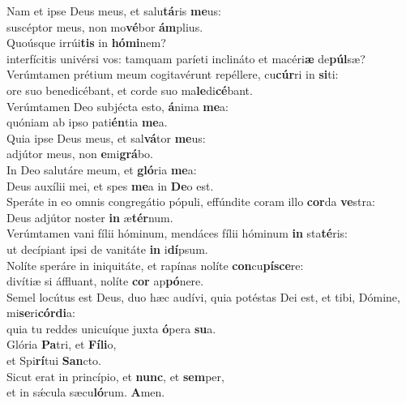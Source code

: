 \evenverse Nam et ipse Deus meus, et salu\textbf{tá}ris \textbf{me}us:~\*\\
\evenverse suscéptor meus, non mo\textbf{vé}bor \textbf{ám}plius.\\
\oddverse Quoúsque irrúi\textbf{tis} in \textbf{hó}\textbf{mi}nem?~\*\\
\oddverse interfícitis univérsi vos: tamquam paríeti inclináto et macéri\textbf{æ} de\textbf{púl}sæ?\\
\evenverse Verúmtamen prétium meum cogitavérunt repéllere, cu\textbf{cúr}ri in \textbf{si}ti:~\*\\
\evenverse ore suo benedicébant, et corde suo ma\textbf{le}di\textbf{cé}bant.\\
\oddverse Verúmtamen Deo subjécta esto, \textbf{á}nima \textbf{me}a:~\*\\
\oddverse quóniam ab ipso pati\textbf{én}tia \textbf{me}a.\\
\evenverse Quia ipse Deus meus, et sal\textbf{vá}tor \textbf{me}us:~\*\\
\evenverse adjútor meus, non \textbf{e}mi\textbf{grá}bo.\\
\oddverse In Deo salutáre meum, et \textbf{gló}ria \textbf{me}a:~\*\\
\oddverse Deus auxílii mei, et spes \textbf{me}a in \textbf{De}o est.\\
\evenverse Speráte in eo omnis congregátio pópuli, effúndite coram illo \textbf{cor}da \textbf{ve}stra:~\*\\
\evenverse Deus adjútor noster \textbf{in} æ\textbf{tér}num.\\
\oddverse Verúmtamen vani fílii hóminum, mendáces fílii hóminum \textbf{in} sta\textbf{té}ris:~\*\\
\oddverse ut decípiant ipsi de vanitáte \textbf{in} i\textbf{dí}psum.\\
\evenverse Nolíte speráre in iniquitáte, et rapínas nolíte \textbf{con}cu\textbf{pí}\textbf{sce}re:~\*\\
\evenverse divítiæ si áffluant, nolíte \textbf{cor} ap\textbf{pó}nere.\\
\oddverse Semel locútus est Deus, duo hæc audívi, quia potéstas Dei est, et tibi, Dómine, mi\textbf{se}ri\textbf{cór}\textbf{di}a:~\*\\
\oddverse quia tu reddes unicuíque juxta \textbf{ó}pera \textbf{su}a.\\
\evenverse Glória \textbf{Pa}tri, et \textbf{Fí}\textbf{li}o,~\*\\
\evenverse et Spi\textbf{rí}tui \textbf{San}cto.\\
\oddverse Sicut erat in princípio, et \textbf{nunc}, et \textbf{sem}per,~\*\\
\oddverse et in sǽcula sæcu\textbf{ló}rum. \textbf{A}men.\\
